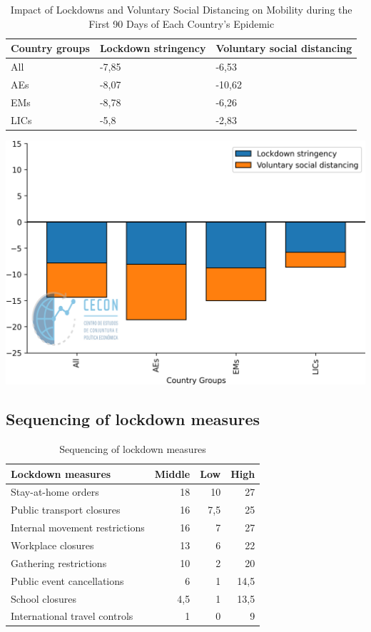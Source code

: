\documentclass{SelfArx}
\begin{document}
\begin{table}[htbp]
\caption{\label{Vol_String}Impact of Lockdowns and Voluntary Social Distancing on Mobility during the First 90 Days of Each Country’s Epidemic}
\centering
\begin{tabular}{lll}
Country groups & Lockdown stringency & Voluntary social distancing\\
\hline
All & -7,85 & -6,53\\
AEs & -8,07 & -10,62\\
EMs & -8,78 & -6,26\\
LICs & -5,8 & -2,83\\
\hline
\end{tabular}
\end{table}

\begin{center}
\includegraphics[width=.9\linewidth]{./figs/IMF/Vol_String.png}
\end{center}

\subsection*{Sequencing of lockdown measures}
\label{sec:org97f5e60}
\begin{table}[htbp]
\caption{\label{Lock_measure}Sequencing of lockdown measures}
\centering
\begin{tabular}{lrrr}
\hline
Lockdown measures & Middle & Low & High\\
\hline
Stay-at-home orders & 18 & 10 & 27\\
Public transport closures & 16 & 7,5 & 25\\
Internal movement restrictions & 16 & 7 & 27\\
Workplace closures & 13 & 6 & 22\\
Gathering restrictions & 10 & 2 & 20\\
Public event cancellations & 6 & 1 & 14,5\\
School closures & 4,5 & 1 & 13,5\\
International travel controls & 1 & 0 & 9\\
\hline
\end{tabular}
\end{table}
\end{document}

